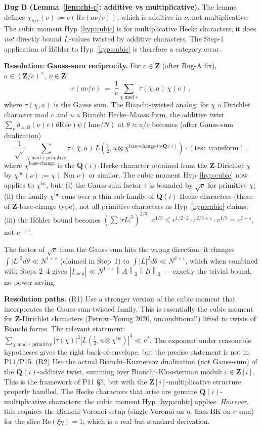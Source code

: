 \documentclass[11pt]{article}
\theoremstyle{definition}
\newcommand{\Z}{\mathbf{Z}}
\newcommand{\Q}{\mathbf{Q}}
\newcommand{\Zi}{\Z[i]}
\newcommand{\Qi}{\Q(i)}
\renewcommand{\Re}{\mathrm{Re}}
\renewcommand{\Im}{\mathrm{Im}}
\newcommand{\norm}[1]{\left\lVert #1\right\rVert}
\DeclareMathOperator{\Nm}{Nm}
\begin{document}
\textbf{Bug B (Lemma~\ref{lem:chi-c}: additive vs multiplicative).}
The lemma defines $\chi_{a/c}(\nu):=e(\Re(a\nu/c))$, which is additive in $\nu$, not multiplicative. The cubic moment Hyp~\ref{hyp:cubic} is for multiplicative Hecke characters; it does \emph{not} directly bound $L$-values twisted by additive characters. The Step-1 application of Hölder to Hyp~\ref{hyp:cubic} is therefore a category error.

\textbf{Resolution: Gauss-sum reciprocity.} For $c\in\Z$ (after Bug-A fix), $a\in(\Z/c)^\times$, $\nu\in\Z$:
\[
   e(a\nu/c)\;=\;\frac{1}{c}\sum_{\chi\text{ mod }c}\tau(\bar\chi,a)\,\chi(\nu)\,,
\]
where $\tau(\chi,a)$ is the Gauss sum. The Bianchi-twisted analog: for $\chi$ a Dirichlet character mod $c$ and $u$ a Bianchi Hecke--Maass form, the additive twist $\sum_\nu d_{A,B}(\nu)e(\theta\Re\nu)\psi(\Im\nu/N)$ at $\theta\approx a/c$ becomes (after Gauss-sum dualization)
\[
   \frac{1}{\sqrt c}\sum_{\chi\text{ mod }c\text{ primitive}}\tau(\bar\chi,a)\,L(\tfrac12,u\otimes\chi^{\text{base-change-to-}\Qi})\cdot(\text{test transform})\,,
\]
where $\chi^{\text{base-change}}$ is the $\Qi$-Hecke character obtained from the $\Z$-Dirichlet $\chi$ by $\chi^{\text{bc}}(\nu):=\chi(\Nm\nu)$ or similar. The cubic moment Hyp~\ref{hyp:cubic} now applies to $\chi^{\text{bc}}$, but: (i) the Gauss-sum factor $\tau$ is bounded by $\sqrt c$ for primitive $\chi$; (ii) the family $\chi^{\text{bc}}$ runs over a thin sub-family of $\Qi$-Hecke characters (those of $\Z$-base-change type), not all primitive characters as Hyp~\ref{hyp:cubic} claims; (iii) the Hölder bound becomes $(\sum|\tau L|^3)^{2/3}\cdot c^{1/3}\le c^{1/2\cdot 2}\cdot c^{2/3+\varepsilon}\cdot c^{1/3}=c^{2+\varepsilon}$, not $c^{1+\varepsilon}$.

The factor of $\sqrt c$ from the Gauss sum hits the wrong direction: it changes $\int|L|^2 d\theta\ll N^{1+\varepsilon}$ (claimed in Step~1) to $\int|L|^2 d\theta\ll N^{2+\varepsilon}$, which when combined with Steps 2--4 gives $|I_{\text{cusp}}|\ll N^{1+\varepsilon}\norm A_2\norm B_2$ — exactly the trivial bound, no power saving.

\textbf{Resolution paths.}
(R1) Use a stronger version of the cubic moment that incorporates the Gauss-sum-twisted family. This is essentially the cubic moment for $\Z$-Dirichlet characters (Petrow--Young 2020, unconditional!) lifted to twists of Bianchi forms. The relevant statement: $\sum_{\chi\text{ mod }c\text{ primitive}}|\tau(\chi)|^2|L(\tfrac12,u\otimes\chi^{\text{bc}})|^3\ll c^{?}$. The exponent under reasonable hypotheses gives the right back-of-envelope, but the precise statement is not in P11/P15.
(R2) Use the actual Bianchi--Kuznetsov dualization (not Gauss-sum) of the $\Qi$-additive twist, summing over Bianchi--Kloosterman moduli $c\in\Zi$. This is the framework of P11 §5, but with the $\Z[i]$-multiplicative structure properly handled. The Hecke characters that arise are genuine $\Qi$-multiplicative characters; the cubic moment Hyp~\ref{hyp:cubic} applies. \emph{However,} this requires the Bianchi-Voronoi setup (single Voronoi on $\eta$, then BK on $c$-sum) for the slice $\Re(\xi\eta)=1$, which is a real but standard derivation.
\end{document}
